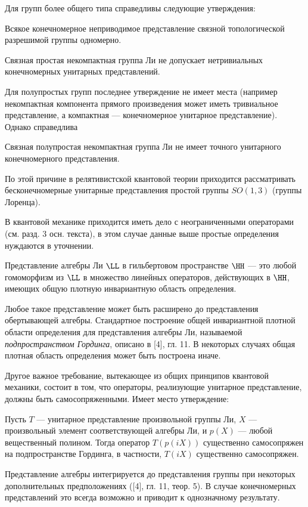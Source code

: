 \documentclass[a4paper
]{article}
\begin{document}
Для групп более общего типа  справедливы следующие утверждения:
\begin{Trm}
Всякое конечномерное неприводимое представление связной
топологической разрешимой группы одномерно.
\end{Trm}
\begin{Trm}
Связная простая некомпактная группа Ли не допускает нетривиальных
конечномерных унитарных представлений.
\end{Trm}
Для полупростых групп последнее утверждение не имеет места
(например некомпактная компонента прямого произведения может иметь
тривиальное представление, а компактная --- конечномерное
унитарное представление). Однако справедлива
\begin{Trm}
Связная полупростая некомпактная группа Ли не имеет точного
унитарного конечномерного представления.
\end{Trm}
По этой причине в релятивистской квантовой теории приходится
рассматривать бесконечномерные унитарные представления простой
группы $SO(1,3)$ (группы Лоренца).
\par
В квантовой механике приходится иметь дело с неограниченными
операторами (см. разд. 3 осн. текста), в этом случае данные выше
простые определения нуждаются в уточнении.
\begin{Def}
Представление алгебры Ли $\LL$  в гильбертовом пространстве $\HH$
--- это любой гомоморфизм из $\LL$  в множество линейных
операторов, действующих  в $\HH$, имеющих общую плотную
инвариантную область определения.
\end{Def}
Любое такое представление может быть расширено до представления
обертывающей алгебры. Стандартное построение общей инвариантной
плотной области определения для представления алгебры Ли,
называемой {\em подпространством Гординга}, описано в [4], гл. 11.
В некоторых случаях общая плотная область определения может быть
построена иначе.
\par Другое важное требование, вытекающее из общих принципов
квантовой механики, состоит в том, что операторы, реализующие
унитарное представление, должны быть самосопряженными. Имеет место
утверждение:
\begin{Trm}
Пусть  $T$ --- унитарное представление произвольной группы Ли, $X$
--- произвольный элемент соответствующей алгебры Ли, и  $p(X)$  ---
любой вещественный полином. Тогда оператор $T(p(iX))$  существенно
самосопряжен на подпространстве Гординга, в частности, $T(iX)$
существенно самосопряжен.
\end{Trm}
Представление алгебры интегрируется до представления группы при
некоторых дополнительных предположениях ([4], гл. 11, теор. 5). В
случае конечномерных представлений это всегда возможно и приводит
к однозначному результату.
\end{document}
